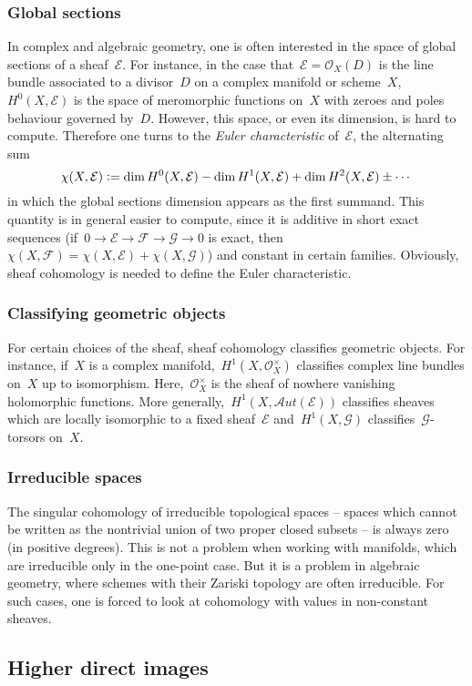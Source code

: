 \documentclass[10pt]{amsart}
\theoremstyle{definition}
\theoremstyle{plain}
\theoremstyle{remark}
\newcommand{\E}{\mathcal{E}}
\newcommand{\F}{\mathcal{F}}
\newcommand{\G}{\mathcal{G}}
\renewcommand{\O}{\mathcal{O}}
\newcommand{\defeq}{\vcentcolon=}
\begin{document}
\subsubsection*{Global sections} In complex and algebraic geometry, one is often
interested in the space of global sections of a sheaf~$\E$. For instance, in
the case that~$\E = \O_X(D)$ is the line bundle associated to a divisor~$D$ on a
complex manifold or scheme~$X$, $H^0(X,\E)$ is the space of meromorphic
functions on~$X$ with zeroes and poles behaviour governed by~$D$. However, this
space, or even its dimension, is hard to compute. Therefore one turns to the
\emph{Euler characteristic} of~$\E$, the alternating sum
\[ \chi(X,\E) \defeq \dim H^0(X,\E) - \dim H^1(X,\E) + \dim H^2(X,\E) \pm
\cdots \]
in which the global sections dimension appears as the first summand. This
quantity is in general easier to compute, since it is additive in short exact
sequences (if~$0 \to \E \to \F \to \G \to 0$ is exact, then~$\chi(X,\F) =
\chi(X,\E) + \chi(X,\G)$) and constant in certain families. Obviously,
sheaf cohomology is needed to define the Euler characteristic.

\subsubsection*{Classifying geometric objects} For certain choices of the sheaf, sheaf
cohomology classifies geometric objects. For instance, if~$X$ is a complex
manifold,~$H^1(X,\O_X^\times)$ classifies complex line bundles on~$X$ up to
isomorphism. Here,~$\O_X^\times$ is the sheaf of nowhere vanishing holomorphic
functions. More generally,~$H^1(X,\mathcal{A}ut(\E))$ classifies sheaves which
are locally isomorphic to a fixed sheaf~$\E$ and~$H^1(X,\G)$
classifies~$\G$-torsors on~$X$.

\subsubsection*{Irreducible spaces} The singular cohomology of irreducible topological
spaces -- spaces which cannot be written as the nontrivial union of two proper
closed subsets -- is always zero (in positive degrees). This is not a problem
when working with manifolds, which are irreducible only in the one-point case.
But it is a problem in algebraic geometry, where schemes with their Zariski
topology are often irreducible. For such cases, one is forced to look at
cohomology with values in non-constant sheaves.


\subsection{Higher direct images}
\end{document}

